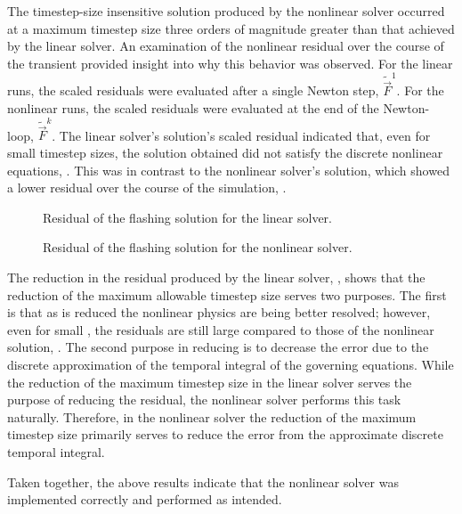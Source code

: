 The timestep-size insensitive solution produced by the nonlinear solver occurred at a maximum timestep size three orders of magnitude greater than that achieved by the linear solver.
An examination of the nonlinear residual over the course of the transient provided insight into why this behavior was observed.
For the linear runs, the scaled residuals were evaluated after a single Newton step, $\tilde{\vec{F}}^{1}$.
For the nonlinear runs, the scaled residuals were evaluated at the end of the Newton-loop, $\tilde{\vec{F}}^{k}$.
The linear solver's solution's scaled residual indicated that, even for small timestep sizes, the solution obtained did not satisfy the discrete nonlinear equations, .
This was in contrast to the nonlinear solver's solution, which showed a lower residual over the course of the simulation, .

\begin{figure}[h!tb]
\centering

\caption{Residual of the flashing solution for the linear solver.}
\label{fig:flashingResidualLin}
\end{figure}

\begin{figure}[h!tb]
\centering

\caption{Residual of the flashing solution for the nonlinear solver.}
\label{fig:flashingResidualNln}
\end{figure}

The reduction in the residual produced by the linear solver, , shows that the reduction of the maximum allowable timestep size serves two purposes.
The first is that as \dtmax{} is reduced the nonlinear physics are being better resolved; however, even for small \dtmax{}, the residuals are still large compared to those of the nonlinear solution, .
The second purpose in reducing \dtmax{} is to decrease the error due to the discrete approximation of the temporal integral of the governing equations.
While the reduction of the maximum timestep size in the linear solver serves the purpose of reducing the residual, the nonlinear solver performs this task naturally.
Therefore, in the nonlinear solver the reduction of the maximum timestep size primarily serves to reduce the error from the approximate discrete temporal integral.

Taken together, the above results indicate that the nonlinear solver was implemented correctly and performed as intended.

